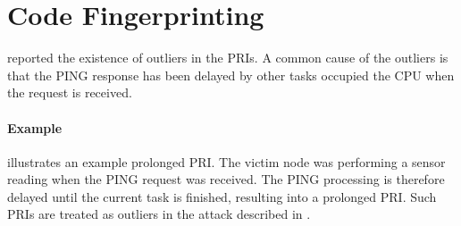 \section{Code Fingerprinting}
 reported the existence of outliers in the PRIs. A common cause of the outliers is that the PING response has been delayed by other tasks occupied the CPU when the request is received. 

\paragraph{Example}  illustrates an example prolonged PRI. The victim node was performing a sensor reading when the PING request was received. The PING processing is therefore delayed until the current task is finished, resulting into a prolonged PRI. Such PRIs are treated as outliers in the attack described in .


